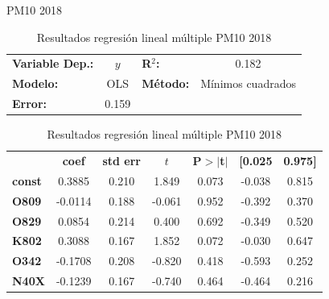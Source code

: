 \documentclass[11pt]{beamer}
\begin{document}
\begin{frame}{PM10 2018}
\begin{table}[hbt!]
\caption{Resultados regresión lineal múltiple PM10 2018}
\label{tab:RRLM PM10 2018}
\begin{center}
\begin{tabular}{lclc}
\textbf{Variable Dep.:}    &        $y$         & \textbf{  R$^2$:         } &     0.182   \\
\textbf{Modelo:}            &       OLS        & \textbf{Método:}           &  Mínimos cuadrados  \\
\textbf{Error:}            & 0.159  \\
\end{tabular}
\begin{tabular}{lcccccc}
               & \textbf{coef} & \textbf{std err} & \textbf{$t$} & \textbf{P$> |$t$|$} & \textbf{[0.025} & \textbf{0.975]}  \\
\textbf{const} &       0.3885  &        0.210     &     1.849  &         0.073        &       -0.038    &        0.815     \\
\textbf{O809}  &      -0.0114  &        0.188     &    -0.061  &         0.952        &       -0.392    &        0.370     \\
\textbf{O829}  &       0.0854  &        0.214     &     0.400  &         0.692        &       -0.349    &        0.520     \\
\textbf{K802}  &       0.3088  &        0.167     &     1.852  &         0.072        &       -0.030    &        0.647     \\
\textbf{O342}  &      -0.1708  &        0.208     &    -0.820  &         0.418        &       -0.593    &        0.252     \\
\textbf{N40X}  &      -0.1239  &        0.167     &    -0.740  &         0.464        &       -0.464    &        0.216     \\
\end{tabular}
\end{center}
\end{table}
\end{frame}
\end{document}
